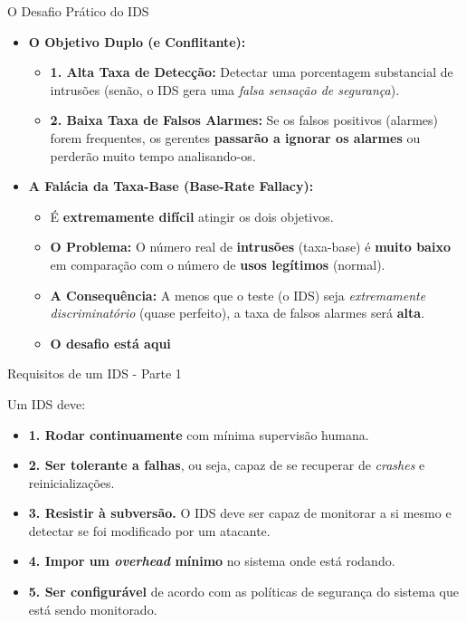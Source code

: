 \begin{frame}{O Desafio Prático do IDS}
    \begin{itemize}
        \item \textbf{O Objetivo Duplo (e Conflitante):}
              \begin{itemize}
                  \item \textbf{1. Alta Taxa de Detecção:} Detectar uma porcentagem substancial de intrusões (senão, o IDS gera uma \textit{falsa sensação de segurança}).
                  \item \textbf{2. Baixa Taxa de Falsos Alarmes:} Se os falsos positivos (alarmes) forem frequentes, os gerentes \textbf{passarão a ignorar os alarmes} ou perderão muito tempo analisando-os.
              \end{itemize}

        \item \textbf{A Falácia da Taxa-Base (Base-Rate Fallacy):}
              \begin{itemize}
                  \item É \textbf{extremamente difícil} atingir os dois objetivos.
                  \item \textbf{O Problema:} O número real de \textbf{intrusões} (taxa-base) é \textbf{muito baixo} em comparação com o número de \textbf{usos legítimos} (normal).
                  \item \textbf{A Consequência:} A menos que o teste (o IDS) seja \textit{extremamente discriminatório} (quase perfeito), a taxa de falsos alarmes será \textbf{alta}.
                  \item \textbf{O desafio está aqui}
              \end{itemize}
    \end{itemize}
\end{frame}

\begin{frame}{Requisitos de um IDS - Parte 1}

    Um IDS deve:
    \begin{itemize}


        \item \textbf{1. Rodar continuamente} com mínima supervisão humana.

        \item \textbf{2. Ser tolerante a falhas}, ou seja, capaz de se recuperar de \textit{crashes} e reinicializações.

        \item \textbf{3. Resistir à subversão.} O IDS deve ser capaz de monitorar a si mesmo e detectar se foi modificado por um atacante.

        \item \textbf{4. Impor um \textit{overhead} mínimo} no sistema onde está rodando.

        \item \textbf{5. Ser configurável} de acordo com as políticas de segurança do sistema que está sendo monitorado.
    \end{itemize}
\end{frame}

